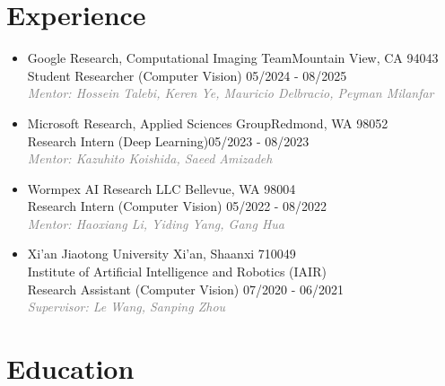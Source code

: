 \documentclass[10pt,margin,line,pifont,palatino,courier]{res}
\begin{document}
\begin{resume}
\section{\sc Experience}

\begin{itemize}[leftmargin=*]
    \item Google Research, Computational Imaging Team\hfill Mountain View, CA 94043\\
        Student Researcher (Computer Vision) \hfill 05/2024 - 08/2025\\
        \textcolor{gray}{\small\it Mentor: Hossein Talebi, Keren Ye, Mauricio Delbracio, Peyman Milanfar}
    \item Microsoft Research, Applied Sciences Group\hfill Redmond, WA 98052\\
        Research Intern (Deep Learning)\hfill 05/2023 - 08/2023\\
        \textcolor{gray}{\small\it Mentor: Kazuhito Koishida, Saeed Amizadeh}
    \item Wormpex AI Research LLC \hfill Bellevue, WA 98004\\
        Research Intern (Computer Vision) \hfill 05/2022 - 08/2022\\
        \textcolor{gray}{\small\it Mentor: Haoxiang Li, Yiding Yang, Gang Hua}
    \item Xi'an Jiaotong University \hfill Xi'an, Shaanxi 710049\\
        Institute of Artificial Intelligence and Robotics (IAIR) \\
        Research Assistant (Computer Vision) \hfill 07/2020 - 06/2021\\
        \textcolor{gray}{\small\it Supervisor: Le Wang, Sanping Zhou}
\end{itemize}

\section{\sc Education}


\end{resume}
\end{document}
